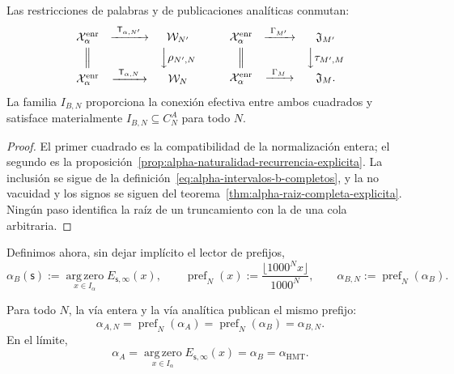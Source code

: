 \begin{proposition}
\label{prop:alpha-cuadrados-compatibilidad}
Las restricciones de palabras y de publicaciones analíticas conmutan:
\[
\begin{array}{ccc}
 \mathcal X_\alpha^{\mathrm{enr}}&
 \xrightarrow{\ \mathsf T_{\alpha,N'}\ }&\mathcal W_{N'}\\[1mm]
 \Big\Vert&&\Big\downarrow\rho_{N',N}\\[1mm]
 \mathcal X_\alpha^{\mathrm{enr}}&
 \xrightarrow{\ \mathsf T_{\alpha,N}\ }&\mathcal W_N
\end{array}
\qquad
\begin{array}{ccc}
 \mathcal X_\alpha^{\mathrm{enr}}&
 \xrightarrow{\ \Gamma_{M'}\ }&\mathfrak J_{M'}\\[1mm]
 \Big\Vert&&\Big\downarrow\tau_{M',M}\\[1mm]
 \mathcal X_\alpha^{\mathrm{enr}}&
 \xrightarrow{\ \Gamma_M\ }&\mathfrak J_M .
\end{array}
\]
La familia \(I_{B,N}\) proporciona la conexión efectiva entre ambos
cuadrados y satisface materialmente
\(I_{B,N}\subseteq C_N^A\) para todo \(N\).
\end{proposition}

\begin{proof}
El primer cuadrado es la compatibilidad de la normalización entera; el segundo
es la proposición~\ref{prop:alpha-naturalidad-recurrencia-explicita}. La
inclusión se sigue de la definición~\eqref{eq:alpha-intervalos-b-completos},
y la no vacuidad y los signos se siguen del
teorema~\ref{thm:alpha-raiz-completa-explicita}. Ningún paso identifica la
raíz de un truncamiento con la de una cola arbitraria.
\end{proof}

Definimos ahora, sin dejar implícito el lector de prefijos,
\begin{equation}
 \alpha_B(\mathsf s):=
 \operatorname*{arg\,zero}_{x\in I_\alpha}E_{\mathsf s,\infty}(x),
 \qquad
 \operatorname{pref}_N(x):=
 \frac{\lfloor1000^Nx\rfloor}{1000^N},
 \qquad
 \alpha_{B,N}:=\operatorname{pref}_N(\alpha_B).
 \label{eq:alpha-definicion-b-y-prefijos-rev08}
\end{equation}

\begin{theorem}
\label{thm:alpha-dos-publicaciones-completas}
Para todo \(N\), la vía entera y la vía analítica publican el mismo prefijo:
\begin{equation}
 \boxed{\alpha_{A,N}=\operatorname{pref}_N(\alpha_A)
 =\operatorname{pref}_N(\alpha_B)=\alpha_{B,N}.}
 \label{eq:alpha-dos-vias-cada-nivel}
\end{equation}
En el límite,
\begin{equation}
 \boxed{\alpha_A
 =\operatorname*{arg\,zero}_{x\in I_\alpha}
       E_{\mathsf s,\infty}(x)
 =\alpha_B=\alpha_{\mathrm{HMT}}.}
 \label{eq:alpha-dos-vias-limite-coinductivo}
\end{equation}
\end{theorem}


